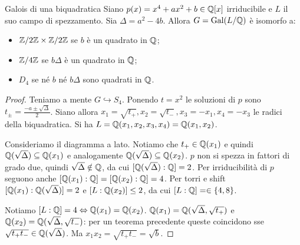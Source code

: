 \begin{theorem}{Galois di una biquadratica}
    Siano $p(x) = x^4 + ax^2 + b \in \mathbb{Q}[x]$ irriducibile e $L$ il suo campo di spezzamento. Sia $\Delta = a^2 - 4b$. Allora $G = \text{Gal}(L / \mathbb{Q})$ è isomorfo a:
    \begin{itemize}
        \item $\mathbb{Z}/2\mathbb{Z} \times \mathbb{Z}/2\mathbb{Z}$ se $b$ è un quadrato in $\mathbb{Q}$;
        \item $\mathbb{Z}/4\mathbb{Z}$ se $b\Delta$ è un quadrato in $\mathbb{Q}$;
        \item $D_4$ se né $b$ né $b\Delta$ sono quadrati in $\mathbb{Q}$.
    \end{itemize}
\end{theorem}
\begin{proof}
    Teniamo a mente $G \hookrightarrow S_4$.
    Ponendo $t = x^2$ le soluzioni di $p$ sono $t_{\pm} = \frac{-a \pm \sqrt{\Delta}}{2}$. Siano allora $x_1 = \sqrt{t_+}, x_2 = \sqrt{t_-}, x_3 = -x_1, x_4=-x_3$ le radici della biquadratica. Si ha $L = \mathbb{Q}(x_1,x_2,x_3,x_4)=\mathbb{Q}(x_1,x_2)$.

    \begin{minipage}{0.55\textwidth}  
    Consideriamo il diagramma a lato. Notiamo che $t_+ \in \mathbb{Q}(x_1)$ e quindi $\mathbb{Q}(\sqrt{\Delta}) \subseteq \mathbb{Q}(x_1)$ e analogamente $\mathbb{Q}(\sqrt{\Delta}) \subseteq \mathbb{Q}(x_2)$. $p$ non si spezza in fattori di grado due, quindi $\sqrt{\Delta} \notin \mathbb{Q}$, da cui $[\mathbb{Q}(\sqrt{\Delta}) : \mathbb{Q}] = 2$. Per irriducibilità di $p$ seguono anche $[\mathbb{Q}(x_1): \mathbb{Q}] = [\mathbb{Q}(x_2) :  \mathbb{Q}] = 4$. Per torri e shift $[\mathbb{Q}(x_1) : \mathbb{Q}(\sqrt{\Delta})] = 2$ e $[L : \mathbb{Q}(x_2)] \leq 2$, da cui $[L : \mathbb{Q}] = \in \{4, 8\}$.
    \end{minipage}\hfill
    \begin{minipage}{0.4\textwidth}  
    \end{minipage}\hfill

    Notiamo $[L : \mathbb{Q}] = 4 \Leftrightarrow \mathbb{Q}(x_1) = \mathbb{Q}(x_2)$. $\mathbb{Q}(x_1) = \mathbb{Q}(\sqrt{\Delta}, \sqrt{t_+})$ e $\mathbb{Q}(x_2) = \mathbb{Q}(\sqrt{\Delta}, \sqrt{t_-})$: per un teorema precedente queste coincidono sse $\sqrt{t_+ t_-} \in \mathbb{Q}(\sqrt{\Delta})$. Ma $x_1x_2 = \sqrt{t_+ t_-} = \sqrt{b}$.
    

\end{proof}
